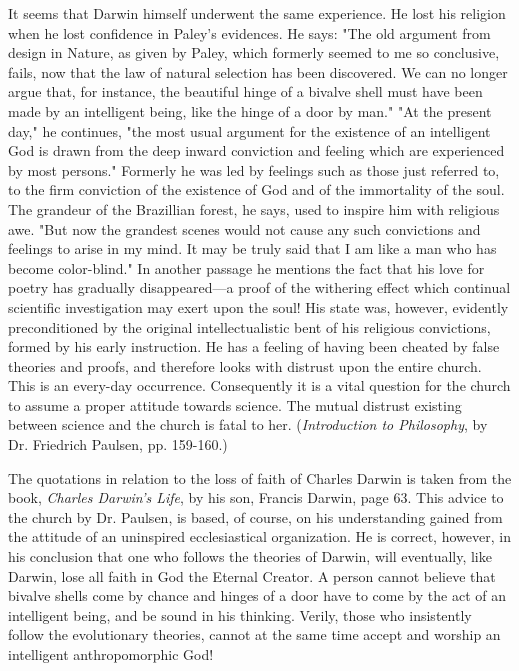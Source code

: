 It seems that Darwin himself underwent the same experience. He lost his religion when he
lost confidence in Paley's evidences. He says: "The old argument from design in Nature, as
given by Paley, which formerly seemed to me so conclusive, fails, now that the law of
natural selection has been discovered. We can no longer argue that, for instance, the beautiful
hinge of a bivalve shell must have been made by an intelligent being, like the hinge of a door
by man." "At the present day," he continues, "the most usual argument for the existence of an
intelligent God is drawn from the deep inward conviction and feeling which are experienced
by most persons." Formerly he was led by feelings such as those just referred to, to the firm
conviction of the existence of God and of the immortality of the soul. The grandeur of the
Brazillian forest, he says, used to inspire him with religious awe. "But now the grandest
scenes would not cause any such convictions and feelings to arise in my mind. It may be
truly said that I am like a man who has become color-blind." In another passage he mentions
the fact that his love for poetry has gradually disappeared—a proof of the withering effect
which continual scientific investigation may exert upon the soul! His state was, however,
evidently preconditioned by the original intellectualistic bent of his religious convictions,
formed by his early instruction. He has a feeling of having been cheated by false theories and
proofs, and therefore looks with distrust upon the entire church. This is an every-day
occurrence. Consequently it is a vital question for the church to assume a proper attitude
towards science. The mutual distrust existing between science and the church is fatal to her.
(\textit{Introduction to Philosophy}, by Dr. Friedrich Paulsen, pp. 159-160.)

The quotations in relation to the loss of faith of Charles Darwin is taken from the book,
\textit{Charles Darwin's Life}, by his son, Francis Darwin, page 63. This advice to the church by Dr.
Paulsen, is based, of course, on his understanding gained from the attitude of an uninspired
ecclesiastical organization. He is correct, however, in his conclusion that one who follows the
theories of Darwin, will eventually, like Darwin, lose all faith in God the Eternal Creator. A
person cannot believe that bivalve shells come by chance and hinges of a door have to come
by the act of an intelligent being, and be sound in his thinking. Verily, those who insistently
follow the evolutionary theories, cannot at the same time accept and worship an intelligent
anthropomorphic God!

